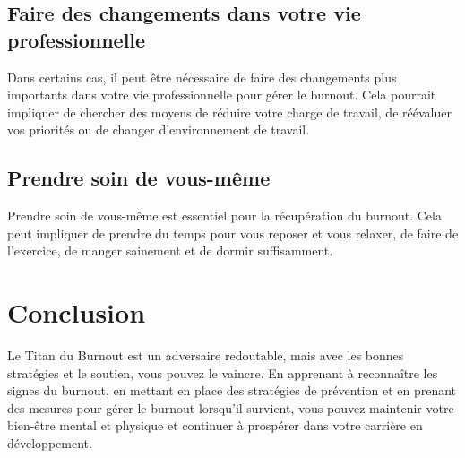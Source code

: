\subsection{Faire des changements dans votre vie professionnelle}

Dans certains cas, il peut être nécessaire de faire des changements plus importants dans votre vie professionnelle pour gérer le burnout. Cela pourrait impliquer de chercher des moyens de réduire votre charge de travail, de réévaluer vos priorités ou de changer d'environnement de travail.

\subsection{Prendre soin de vous-même}

Prendre soin de vous-même est essentiel pour la récupération du burnout. Cela peut impliquer de prendre du temps pour vous reposer et vous relaxer, de faire de l'exercice, de manger sainement et de dormir suffisamment.

\section{Conclusion}

Le Titan du Burnout est un adversaire redoutable, mais avec les bonnes stratégies et le soutien, vous pouvez le vaincre. En apprenant à reconnaître les signes du burnout, en mettant en place des stratégies de prévention et en prenant des mesures pour gérer le burnout lorsqu'il survient, vous pouvez maintenir votre bien-être mental et physique et continuer à prospérer dans votre carrière en développement.

